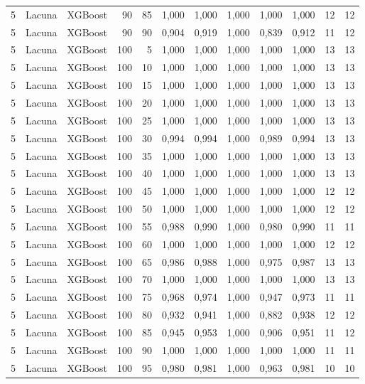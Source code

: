 \begin{longtable}{@{}rllrrrrrrrrr@{}}
5 & Lacuna & XGBoost & 90 & 85 & 1,000 & 1,000 & 1,000 & 1,000 & 1,000 & 12 & 12 \\
5 & Lacuna & XGBoost & 90 & 90 & 0,904 & 0,919 & 1,000 & 0,839 & 0,912 & 11 & 12 \\
5 & Lacuna & XGBoost & 100 & 5 & 1,000 & 1,000 & 1,000 & 1,000 & 1,000 & 13 & 13 \\
5 & Lacuna & XGBoost & 100 & 10 & 1,000 & 1,000 & 1,000 & 1,000 & 1,000 & 13 & 13 \\
5 & Lacuna & XGBoost & 100 & 15 & 1,000 & 1,000 & 1,000 & 1,000 & 1,000 & 13 & 13 \\
5 & Lacuna & XGBoost & 100 & 20 & 1,000 & 1,000 & 1,000 & 1,000 & 1,000 & 13 & 13 \\
5 & Lacuna & XGBoost & 100 & 25 & 1,000 & 1,000 & 1,000 & 1,000 & 1,000 & 13 & 13 \\
5 & Lacuna & XGBoost & 100 & 30 & 0,994 & 0,994 & 1,000 & 0,989 & 0,994 & 13 & 13 \\
5 & Lacuna & XGBoost & 100 & 35 & 1,000 & 1,000 & 1,000 & 1,000 & 1,000 & 13 & 13 \\
5 & Lacuna & XGBoost & 100 & 40 & 1,000 & 1,000 & 1,000 & 1,000 & 1,000 & 13 & 13 \\
5 & Lacuna & XGBoost & 100 & 45 & 1,000 & 1,000 & 1,000 & 1,000 & 1,000 & 12 & 12 \\
5 & Lacuna & XGBoost & 100 & 50 & 1,000 & 1,000 & 1,000 & 1,000 & 1,000 & 12 & 12 \\
5 & Lacuna & XGBoost & 100 & 55 & 0,988 & 0,990 & 1,000 & 0,980 & 0,990 & 11 & 11 \\
5 & Lacuna & XGBoost & 100 & 60 & 1,000 & 1,000 & 1,000 & 1,000 & 1,000 & 12 & 12 \\
5 & Lacuna & XGBoost & 100 & 65 & 0,986 & 0,988 & 1,000 & 0,975 & 0,987 & 13 & 13 \\
5 & Lacuna & XGBoost & 100 & 70 & 1,000 & 1,000 & 1,000 & 1,000 & 1,000 & 13 & 13 \\
5 & Lacuna & XGBoost & 100 & 75 & 0,968 & 0,974 & 1,000 & 0,947 & 0,973 & 11 & 11 \\
5 & Lacuna & XGBoost & 100 & 80 & 0,932 & 0,941 & 1,000 & 0,882 & 0,938 & 12 & 12 \\
5 & Lacuna & XGBoost & 100 & 85 & 0,945 & 0,953 & 1,000 & 0,906 & 0,951 & 11 & 12 \\
5 & Lacuna & XGBoost & 100 & 90 & 1,000 & 1,000 & 1,000 & 1,000 & 1,000 & 11 & 11 \\
5 & Lacuna & XGBoost & 100 & 95 & 0,980 & 0,981 & 1,000 & 0,963 & 0,981 & 10 & 10 \\

\end{longtable}

